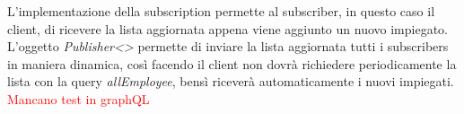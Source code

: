 \FloatBarrier
L'implementazione della subscription permette al subscriber, in questo caso il client, di ricevere la lista aggiornata appena viene aggiunto un nuovo impiegato. L'oggetto \textit{Publisher<>} permette di inviare la lista aggiornata  tutti i subscribers in maniera dinamica, così facendo il client non dovrà richiedere periodicamente la lista con la query \textit{allEmployee}, bensì riceverà automaticamente i nuovi impiegati.
\textcolor{red}{Mancano test in graphQL}
